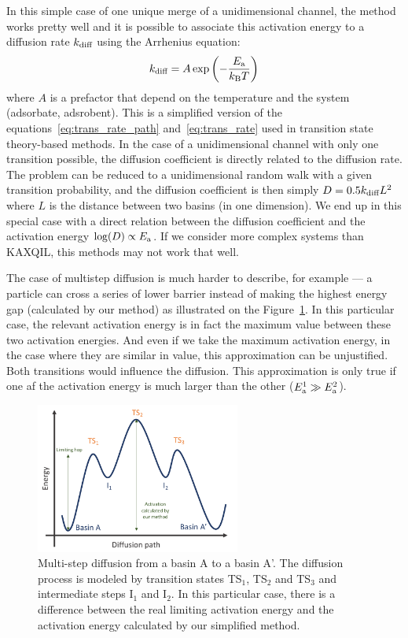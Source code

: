 \documentclass[main]{subfiles}
\begin{document}
In this simple case of one unique merge of a unidimensional channel, the method works pretty well and it is possible to associate this activation energy to a diffusion rate $k_{\text{diff}}$ using the Arrhenius equation:
\begin{equation}
  k_{\text{diff}} = A \exp\left(-\frac{E_{\text{a}}}{k_{\text{B}}T}\right)
\end{equation}
where $A$ is a prefactor that depend on the temperature and the system (adsorbate, adsrobent). This is a simplified version of the equations~\ref{eq:trans_rate_path} and~\ref{eq:trans_rate} used in transition state theory-based methods. In the case of a unidimensional channel with only one transition possible, the diffusion coefficient is directly related to the diffusion rate. The problem can be reduced to a unidimensional random walk with a given transition probability, and the diffusion coefficient is then simply $D=0.5k_{\text{diff}}L^2$ where $L$ is the distance between two basins (in one dimension). We end up in this special case with a direct relation between the diffusion coefficient and the activation energy $\log(D)\propto E_{\text{a}}$.
If we consider more complex systems than KAXQIL, this methods may not work that well. 

The case of multistep diffusion is much harder to describe, for example --- a particle can cross a series of lower barrier instead of making the highest energy gap (calculated by our method) as illustrated on the Figure~\ref{fgr:TS_problem}. In this particular case, the relevant activation energy is in fact the maximum value between these two activation energies. And even if we take the maximum activation energy, in the case where they are similar in value, this approximation can be unjustified. Both transitions would influence the diffusion. This approximation is only true if one af the activation energy is much larger than the other ($E_{\text{a}}^1 \gg E_{\text{a}}^2$).

\begin{figure}[ht]
  \centering
    \includegraphics[width=0.6\textwidth]{figures/5-diffusion/Diffusion_TS.pdf}
    \caption{Multi-step diffusion from a basin A to a basin A'. The diffusion process is modeled by transition states TS$_1$, TS$_2$ and TS$_3$ and intermediate steps I$_1$ and I$_2$. In this particular case, there is a difference between the real limiting activation energy and the activation energy calculated by our simplified method. }\label{fgr:TS_problem}
\end{figure}
\end{document}
